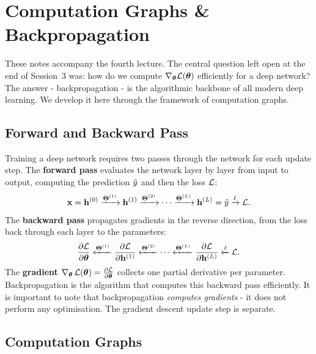 \section{Computation Graphs \& Backpropagation}

These notes accompany the fourth lecture. The central question left open at the end of Session~3 was: how do we compute $\nabla_{\boldsymbol{\theta}} \mathcal{L}(\boldsymbol{\theta})$ efficiently for a deep network? The answer - backpropagation - is the algorithmic backbone of all modern deep learning. We develop it here through the framework of computation graphs.

\subsection{Forward and Backward Pass}

Training a deep network requires two passes through the network for each update step. The \textbf{forward pass} evaluates the network layer by layer from input to output, computing the prediction $\hat{y}$ and then the loss $\mathcal{L}$:
\begin{equation}
\mathbf{x} = \mathbf{h}^{(0)} \xrightarrow{\boldsymbol{\Theta}^{(1)}} \mathbf{h}^{(1)} \xrightarrow{\boldsymbol{\Theta}^{(2)}} \cdots \xrightarrow{\boldsymbol{\Theta}^{(L)}} \mathbf{h}^{(L)} = \hat{y} \xrightarrow{\ell} \mathcal{L}.
\end{equation}
The \textbf{backward pass} propagates gradients in the reverse direction, from the loss back through each layer to the parameters:
\begin{equation}
\frac{\partial \mathcal{L}}{\partial \boldsymbol{\theta}} \xleftarrow{\boldsymbol{\Theta}^{(1)}} \frac{\partial \mathcal{L}}{\partial \mathbf{h}^{(1)}} \xleftarrow{\boldsymbol{\Theta}^{(2)}} \cdots \xleftarrow{\boldsymbol{\Theta}^{(L)}} \frac{\partial \mathcal{L}}{\partial \mathbf{h}^{(L)}} \xleftarrow{\ell} \mathcal{L}.
\end{equation}
The \textbf{gradient} $\nabla_{\boldsymbol{\theta}}\,\mathcal{L}(\boldsymbol{\theta}) = \frac{\partial \mathcal{L}}{\partial \boldsymbol{\theta}}$ collects one partial derivative per parameter. Backpropagation is the algorithm that computes this backward pass efficiently. It is important to note that backpropagation \emph{computes gradients} - it does not perform any optimisation. The gradient descent update step is separate.

\subsection{Computation Graphs}

